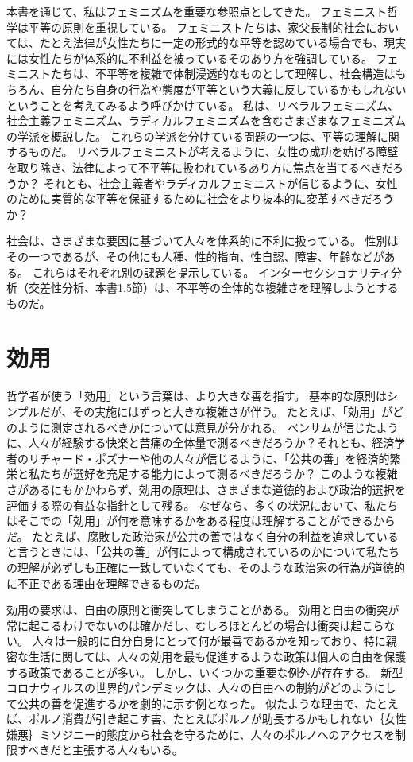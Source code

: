 \documentclass[paper=a4,book,openany]{jlreq}
\begin{document}
本書を通じて、私はフェミニズムを重要な参照点としてきた。
フェミニスト哲学は平等の原則を重視している。
フェミニストたちは、家父長制的社会においては、たとえ法律が女性たちに一定の形式的な平等を認めている場合でも、現実には女性たちが体系的に不利益を被っているそのあり方を強調している。
フェミニストたちは、不平等を複雑で体制浸透的なものとして理解し、社会構造はもちろん、自分たち自身の行為や態度が平等という大義に反しているかもしれないということを考えてみるよう呼びかけている。
私は、リベラルフェミニズム、社会主義フェミニズム、ラディカルフェミニズムを含むさまざまなフェミニズムの学派を概説した。
これらの学派を分けている問題の一つは、平等の理解に関するものだ。
リベラルフェミニストが考えるように、女性の成功を妨げる障壁を取り除き、法律によって不平等に扱われているあり方に焦点を当てるべきだろうか？ それとも、社会主義者やラディカルフェミニストが信じるように、女性のために実質的な平等を保証するために社会をより抜本的に変革すべきだろうか？

社会は、さまざまな要因に基づいて人々を体系的に不利に扱っている。
性別はその一つであるが、その他にも人種、性的指向、性自認、障害、年齢などがある。
これらはそれぞれ別の課題を提示している。
インターセクショナリティ分析（交差性分析、本書1.5節）は、不平等の全体的な複雑さを理解しようとするものだ。

\section{効用}

哲学者が使う「効用」という言葉は、より大きな善を指す。
基本的な原則はシンプルだが、その実施にはずっと大きな複雑さが伴う。
たとえば、「効用」がどのように測定されるべきかについては意見が分かれる。
ベンサムが信じたように、人々が経験する快楽と苦痛の全体量で測るべきだろうか？それとも、経済学者のリチャード・ポズナーや他の人々が信じるように、「公共の善」を経済的繁栄と私たちが選好を充足する能力によって測るべきだろうか？ このような複雑さがあるにもかかわらず、効用の原理は、さまざまな道徳的および政治的選択を評価する際の有益な指針として残る。
なぜなら、多くの状況において、私たちはそこでの「効用」が何を意味するかをある程度は理解することができるからだ。
たとえば、腐敗した政治家が公共の善ではなく自分の利益を追求していると言うときには、「公共の善」が何によって構成されているのかについて私たちの理解が必ずしも正確に一致していなくても、そのような政治家の行為が道徳的に不正である理由を理解できるものだ。

効用の要求は、自由の原則と衝突してしまうことがある。
効用と自由の衝突が常に起こるわけでないのは確かだし、むしろほとんどの場合は衝突は起こらない。
人々は一般的に自分自身にとって何が最善であるかを知っており、特に親密な生活に関しては、人々の効用を最も促進するような政策は個人の自由を保護する政策であることが多い。
しかし、いくつかの重要な例外が存在する。
新型コロナウィルスの世界的パンデミックは、人々の自由への制約がどのようにして公共の善を促進するかを劇的に示す例となった。
似たような理由で、たとえば、ポルノ消費が引き起こす害、たとえばポルノが助長するかもしれない｛女性嫌悪｝{ミソジニー}的態度から社会を守るために、人々のポルノへのアクセスを制限すべきだと主張する人々もいる。
\end{document}
